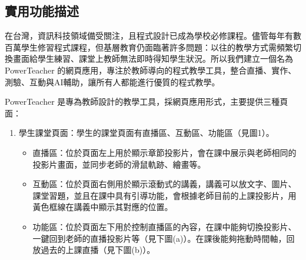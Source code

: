 \documentclass[12pt]{article}
\begin{document}
\subsection{實用功能描述}
在台灣，資訊科技領域備受關注，且程式設計已成為學校必修課程。儘管每年有數百萬學生修習程式課程，但基層教育仍面臨著許多問題：以往的教學方式需頻繁切換畫面給學生練習、課堂上教師無法即時得知學生狀況。所以我們建立一個名為 PowerTeacher 的網頁應用，專注於教師導向的程式教學工具，整合直播、實作、測驗、互動與AI輔助，讓所有人都能進行優質的程式教學。\\
\par PowerTeacher 是專為教師設計的教學工具，採網頁應用形式，主要提供三種頁面：
\begin{enumerate}[label=(\arabic*)]
  \item 學生課堂頁面：學生的課堂頁面有直播區、互動區、功能區（見圖1）。
    \begin{itemize}
      \item 直播區：位於頁面左上用於顯示章節投影片，會在課中展示與老師相同的投影片畫面，並同步老師的滑鼠軌跡、繪畫等。
      \item 互動區：位於頁面右側用於顯示滾動式的講義，講義可以放文字、圖片、課堂習題，並且在課中具有引導功能，會根據老師目前的上課投影片，用黃色框線在講義中顯示其對應的位置。
      \item 功能區：位於頁面左下用於控制直播區的內容，在課中能夠切換投影片、一鍵回到老師的直播投影片等（見下圖(a)）。在課後能夠拖動時間軸，回放過去的上課直播（見下圖(b)）。
    \end{itemize}


\end{enumerate}
\end{document}
